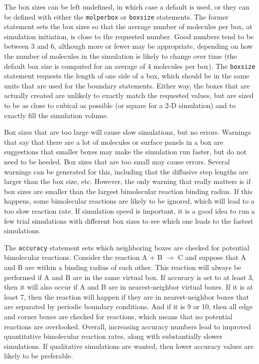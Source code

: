\documentclass {book}
\newcommand {\ttt} {\texttt}
\begin{document}
The box sizes can be left undefined, in which case a default is used, or they can be defined with either the \ttt{molperbox} or \ttt{boxsize} statements. The former statement sets the box sizes so that the average number of molecules per box, at simulation initiation, is close to the requested number. Good numbers tend to be between 3 and 6, although more or fewer may be appropriate, depending on how the number of molecules in the simulation is likely to change over time (the default box size is computed for an average of 4 molecules per box). The \ttt{boxsize} statement requests the length of one side of a box, which should be in the same units that are used for the boundary statements. Either way, the boxes that are actually created are unlikely to exactly match the requested values, but are sized to be as close to cubical as possible (or square for a 2-D simulation) and to exactly fill the simulation volume.

Box sizes that are too large will cause slow simulations, but no errors. Warnings that say that there are a lot of molecules or surface panels in a box are suggestions that smaller boxes may make the simulation run faster, but do not need to be heeded. Box sizes that are too small may cause errors. Several warnings can be generated for this, including that the diffusive step lengths are larger than the box size, etc. However, the only warning that really matters is if box sizes are smaller than the largest bimolecular reaction binding radius. If this happens, some bimolecular reactions are likely to be ignored, which will lead to a too slow reaction rate. If simulation speed is important, it is a good idea to run a few trial simulations with different box sizes to see which one leads to the fastest simulations.

The \ttt{accuracy} statement sets which neighboring boxes are checked for potential bimolecular reactions. Consider the reaction A + B $\rightarrow$ C and suppose that A and B are within a binding radius of each other. This reaction will always be performed if A and B are in the same virtual box. If accuracy is set to at least 3, then it will also occur if A and B are in nearest-neighbor virtual boxes. If it is at least 7, then the reaction will happen if they are in nearest-neighbor boxes that are separated by periodic boundary conditions. And if it is 9 or 10, then all edge and corner boxes are checked for reactions, which means that no potential reactions are overlooked. Overall, increasing accuracy numbers lead to improved quantitative bimolecular reaction rates, along with substantially slower simulations. If qualitative simulations are wanted, then lower accuracy values are likely to be preferable.
\end{document}
